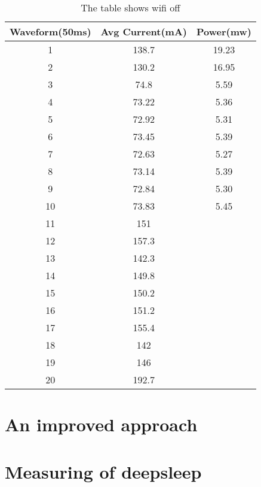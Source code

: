 \begin{table}[h!]
\begin{center}
 \begin{tabular}{||c c c||} 
 \hline
 Waveform(50ms) & Avg Current(mA) & Power(mw)\\ [0.5ex] 
 \hline\hline
 1 & 138.7  & 19.23 \\ 
 \hline
 2 & 130.2  & 16.95 \\
 \hline
 3 & 74.8   & 5.59  \\
 \hline
 4 & 73.22  & 5.36 \\
 \hline
 \rowcolor{red}
 5 & 72.92  & 5.31 \\ 
 \hline
 6 & 73.45  & 5.39 \\ 
 \hline
 7 & 72.63  & 5.27\\
 \hline
 8 & 73.14  & 5.39 \\
 \hline
 9 & 72.84  & 5.30 \\
 \hline
 10 & 73.83 & 5.45 \\ 
 \hline
 11 & 151   &     \\
  \hline
 12 & 157.3 \\
 \hline
 \rowcolor{red}
 13 & 142.3 \\ 
 \hline
 14 & 149.8 \\ 
 \hline
 15 & 150.2 \\
 \hline
 16 & 151.2 \\
 \hline
 17 & 155.4 \\
 \hline
 18 & 142 \\
 \hline
 19 & 146 \\
 \hline
 \rowcolor{red}
 20 & 192.7 \\ 
 [1ex]
\end{tabular}
\end{center}
\caption{The table shows wifi off}
\label{Table:WIFI_OFF}
\end{table}


\section{An improved approach}





\section{Measuring of deepsleep}






















\newpage